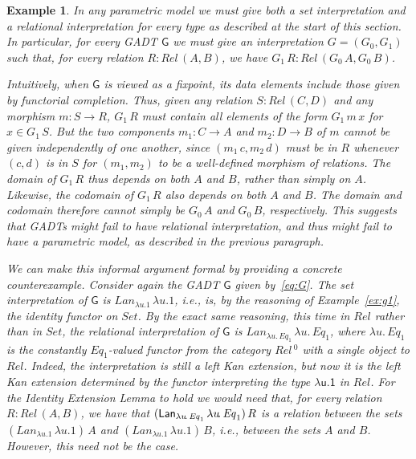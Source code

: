\documentclass[submission,copyright,creativecommons]{eptcs}
\newtheorem{example}[thm]{Example}
\begin{document}
\begin{example}\label{ex:prim-par}
In any parametric model we must give both a set interpretation and a
relational interpretation for every type as described at the start of
this section. In particular, for every GADT $\mathsf{G}$ we must give
an interpretation $G = (G_0,G_1)$ such that, for every relation $R :
\mathit{Rel}\,(A, B)$, we have $G_1\,R : \mathit{Rel}\,(G_0\,A,
G_0\,B)$.

Intuitively, when $\mathsf{G}$ is viewed as a fixpoint, its data
elements include those given by functorial completion. Thus, given any
relation $S : \mathit{Rel}\,(C, D)$ and any morphism $m : S \to R$,
$G_1\, R$ must contain all elements of the form $G_1\,m\,x$ for $x \in
G_1\,S$.  But the two components $m_1 : C \to A$ and $m_2 : D \to B$
of $m$ cannot be given independently of one another, since
$(m_1\,c, m_2\,d)$ must be in $R$ whenever $(c,d)$ is in $S$ for
$(m_1,m_2)$ to be a well-defined morphism of relations.  The domain of
$G_1\, R$ thus depends on both $A$ and $B$, rather than simply on $A$.
Likewise, the codomain of $G_1\,R$ also depends on both $A$ and $B$.
The domain and codomain therefore cannot simply be $G_0\, A$ and
$G_0\, B$, respectively.  This suggests that GADTs might fail to have
relational interpretation, and thus might fail to have a parametric
model, as described in the previous paragraph.

We can make this informal argument formal by providing a concrete
counterexample.  Consider again the GADT $\mathsf{G}$ given
by~\eqref{eq:G}. The set interpretation of $\mathsf{G}$ is
$\mathit{Lan}_{\lambda u\!. 1}\,\lambda u\!. 1$, i.e., is, by the
reasoning of Example~\ref{ex:g1}, the identity functor on
$\mathit{Set}$. By the exact same reasoning, this time in
$\mathit{Rel}$ rather than in $\mathit{Set}$, the relational
interpretation of $\mathsf{G}$ is $\mathit{Lan}_{\lambda
  u\!.\,\mathit{Eq}_1} \,\lambda u\!.\,\mathit{Eq}_1$, where $\lambda
u\!.\,\mathit{Eq}_1$ is the constantly $\mathit{Eq}_1$-valued functor
from the category $\mathit{Rel}\,^0$ with a single object to
$\mathit{Rel}$.  Indeed, the interpretation is still a left Kan
extension, but now it is the left Kan extension determined by the
functor interpreting the type $\mathsf{\lambda u\!. 1}$ in
$\mathit{Rel}$. For the Identity Extension Lemma to hold we would need
that, for every relation $R : \mathit{Rel}\,(A, B)$, we have that
$(\mathit{\mathsf{Lan}}_{\lambda u\!.\,\mathit{Eq}_1} \,\lambda
u\!.\,\mathit{Eq}_1)\, R$ is a relation between the sets
$(\mathit{Lan}_{\lambda u. 1}\,\lambda u\!. 1)\, A$ and
$(\mathit{Lan}_{\lambda u. 1}\,\lambda u\!. 1)\,B$, i.e., between the
sets $A$ and $B$. However,
this need not be the case.


\end{example}
\end{document}
